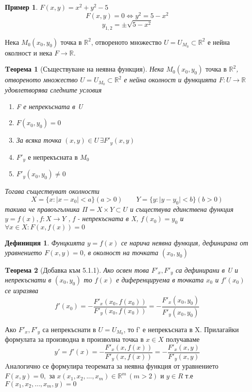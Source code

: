 \documentclass[fleqn,12pt]{article}
\newtheorem{theorem}{Tеорема}[subsection]
\newtheorem{example}{Пример}[subsection]
\newtheorem{definition}{Дефиниция}[subsection]
\begin{document}
\begin{example}
$F(x,y) = x^2 +y^2 - 5$
$$F(x,y) = 0 \Leftrightarrow y^2 = 5-x^2 $$
$$y_{1,2} = \pm \sqrt{5-x^2}$$
\end{example}
Нека $M_0 (x_0, y_0) \text{ точка в } \mathbb{R}^2$, отвореното множество $U = U_{M_0} \subset \mathbb{R}^2$ е нейна околност и нека $F \to \mathbb{R}$. 

\begin{theorem}[Съществуване на неявна функция]
Нека $M_0 (x_0, y_0) \text{ точка в } \mathbb{R}^2$, отвореното множество $U = U_{M_0} \subset \mathbb{R}^2$ е нейна околност и функцията $F: U \to \mathbb{R}$ удовлетворява следните условия
\begin{enumerate}

\item F е непрекъсната в U

\item $F(x_0, y_0) = 0$

\item За всяка точка $(x, y) \in U \, \exists F'_y(x,y)$

\item $F'_y \text{ е непрекъсната в } M_0$

\item $F'_y (x_0, y_0) \neq 0$
\end{enumerate}
Тогава съществуват околности
$$X = \{x: \vert x - x_0 \vert < a\} (a>0) \qquad Y = \{y: \vert y - y_0 \vert < b\} (b>0)$$
такива че правоъгълника $\Pi = X \times Y \subset U$ и съществува единствена функция $y = f(x), f: X \to Y$ , f - непрекъсната в X, $f(x_0) = y_0$ и $\forall x \in X: F(x,f(x)) = 0 $ 
\end{theorem}

\begin{definition}
Фунцкията $y = f(x)$ се нарича неявна функция, дефинирана от уравнението $F(x,y) = 0$, в околност на точката $(x_0, y_0)$
\end{definition}


\begin{theorem}[Добавка към 5.1.1]
Ако освен това $F'_x, F'_y$ са дефинирани в U и непрекъснати в $(x_0, y_0)$ то $f(x)$ е диференцируема в точката $x_0$ и $f'(x_0)$ се изразява
$$f'(x_0) = - \dfrac{F'_x(x_0,f(x_0))}{F'_y(x_0,f(x_0))} = - \dfrac{F'_x(x_0,y_0)}{F'_y(x_0,y_0)} $$
\end{theorem}
Ако $F'_x, F'_y$ са непрекъснати в $U = U_{M_0}$, то f' е непрекъсната в X. Прилагайки формулата за производна в произволна точка в $x \in X$ получаваме
\begin{equation}
y' = f'(x) = - \dfrac{F'_x(x,f(x))}{F'_y(x,f(x))} = - \dfrac{F'_x(x,y)}{F'_y(x,y)}
\end{equation}
Aналогично се формулира теоремата за неявна функция от уравнението $F(x,y) = 0, \text{ за } x(x_1, x_2, ..., x_m) \in \mathbb{R}^m \, (m >2)$ и $y \in R$ т.е $F(x_1, x_2, ..., x_m, y) = 0$\\
\end{document}
